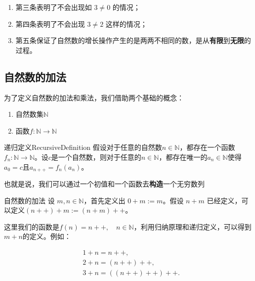 \begin{note}
	\begin{enumerate}
		\item 第三条表明了不会出现如 $3\ne 0$ 的情况；
		\item 第四条表明了不会出现 $3\ne 2$ 这样的情况；
		\item 第五条保证了自然数的增长操作产生的是两两不相同的数，是从\textbf{有限}到\textbf{无限}的过程。
	\end{enumerate}
\end{note}

\subsection{自然数的加法}

为了定义自然数的加法和乘法，我们借助两个基础的概念：

\begin{enumerate}
	\item 自然数集$\mathbb N$
	\item 函数$f:\mathbb N \rightarrow \mathbb N$
\end{enumerate}

\begin{theorem}{递归定义}{RecursiveDefinition}
	假设对于任意的自然数$n\in \mathbb N$，都存在一个函数 $f_n:\mathbb N\rightarrow \mathbb N$。设$c$是一个自然数，则对于任意的$n\in \mathbb N$，都存在唯一的$a_n\in \mathbb N$使得$a_0=c$且$a_{n++} = f_n(a_n)$。
\end{theorem}

\begin{note}
	也就是说，我们可以通过一个初值和一个函数去\textbf{构造}一个无穷数列
\end{note}

\begin{definition}{自然数的加法}{}
	设 $m,n\in \mathbb{N}$，首先定义出 $0+m:=m$。假设 $n+m$ 已经定义，可以定义$(n++)+m:=(n+m)++$。
\end{definition}

\begin{note}
	这里我们的函数是$f(n)=n++,\quad n\in \mathbb N$，利用归纳原理和递归定义，可以得到$m+n$的定义。例如：
\end{note}

\[
\begin{aligned}
	&1+n=n++,\\
	&2+n=(n++)++,\\
	&3+n=((n++)++)++.
\end{aligned}
\]

